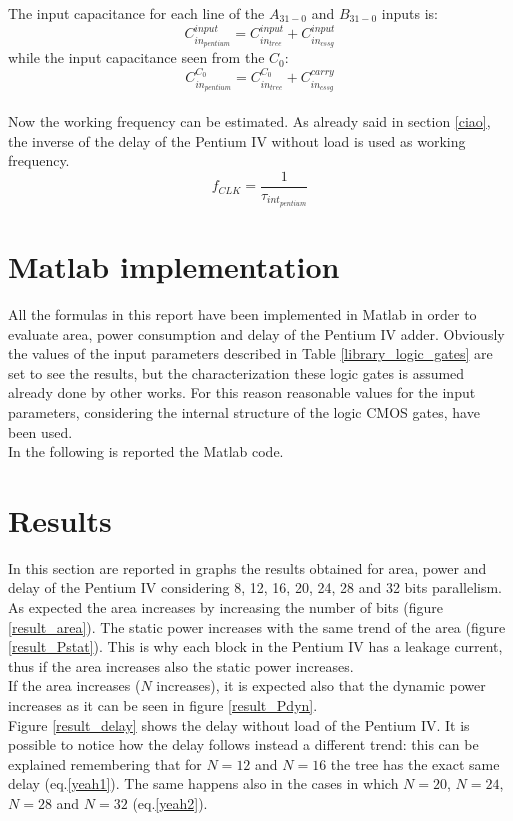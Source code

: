 The input capacitance for each line of the $A_{31-0}$ and $B_{31-0}$ inputs is:
\begin{equation}
C_{in_{pentium}}^{input} = C_{in_{tree}}^{input} + C_{in_{cssg}}^{input}
\end{equation}
while the input capacitance seen from the $C_0$:
\begin{equation}
C_{in_{pentium}}^{C_0} = C_{in_{tree}}^{C_0} + C_{in_{cssg}}^{carry}
\end{equation}
\\
Now the working frequency can be estimated. As already said in section \ref{ciao}, the inverse of the delay of the Pentium IV without load is used as working frequency.\\
\begin{equation}
f_{CLK} = \frac{1}{\tau_{int_{pentium}}}
\end{equation}





\section{Matlab implementation}
All the formulas in this report have been implemented in Matlab in order to evaluate area, power consumption and delay of the Pentium IV adder. Obviously the values of the input parameters described in Table \ref{library_logic_gates} are set to see the results, but  the characterization these logic gates is assumed already done by other works. For this reason reasonable values for the input parameters, considering the internal structure of the logic CMOS gates, have been used.\\
In the following is reported the Matlab code.







\section{Results}
In this section are reported in graphs the results obtained for area, power and delay of the Pentium IV considering 8, 12, 16, 20, 24, 28 and 32 bits parallelism.\\
As expected the area increases by increasing the number of bits (figure \ref{result_area}). The static power increases with the same trend of the area (figure \ref{result_Pstat}). This is why each block in the Pentium IV has a leakage current, thus if the area increases also the static power increases.\\
If the area increases ($N$ increases), it is expected also that the dynamic power increases as it can be seen in figure \ref{result_Pdyn}.\\
Figure \ref{result_delay} shows the delay without load of the Pentium IV. It is possible to notice how the delay follows instead a different trend: this can be explained remembering that for $N=12$ and $N=16$ the tree has the exact same delay (eq.\ref{yeah1}). The same happens also in the cases in which $N=20$, $N=24$, $N=28$ and $N=32$ (eq.\ref{yeah2}).





